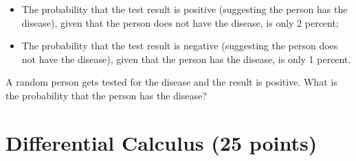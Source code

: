 \documentclass{article}%
\begin{document}
\begin{enumerate}
    \begin{itemize}
        \item The probability that the test result is positive  (suggesting the person has the disease), given that the person does not have the disease, is only 2 percent; 
        \item The probability that the test result is negative (suggesting the person does not have the disease), given that the person has the disease, is only 1 percent. 
    \end{itemize}

    A random person gets tested for the disease and the result is positive. What is the probability that the person has the disease?
\end{enumerate}

\section*{Differential Calculus (25 points)}
\end{document}
